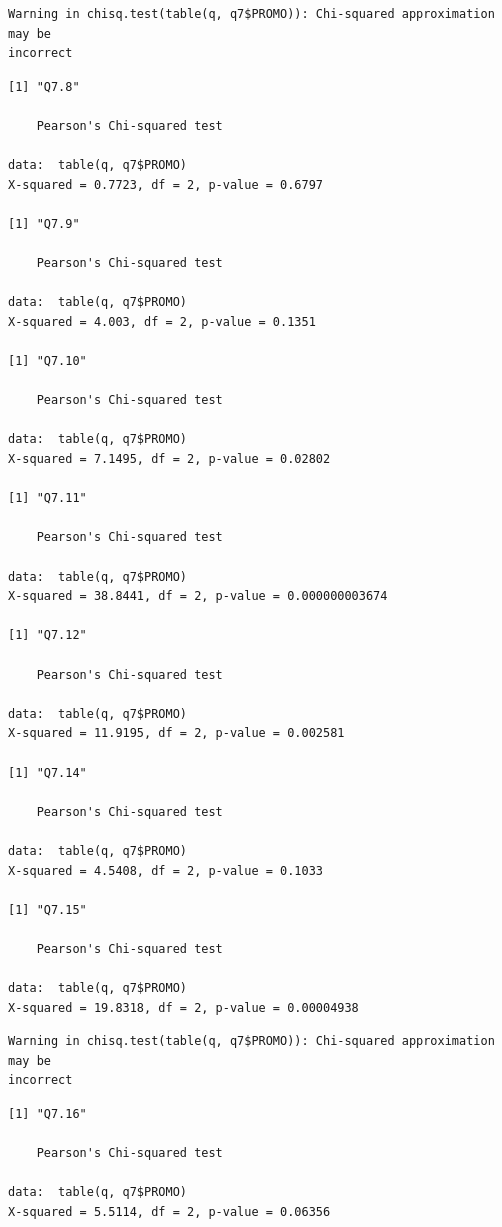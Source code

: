\documentclass[]{article}
\begin{document}
\begin{verbatim}
Warning in chisq.test(table(q, q7$PROMO)): Chi-squared approximation may be
incorrect
\end{verbatim}

\begin{verbatim}
[1] "Q7.8"

    Pearson's Chi-squared test

data:  table(q, q7$PROMO)
X-squared = 0.7723, df = 2, p-value = 0.6797

[1] "Q7.9"

    Pearson's Chi-squared test

data:  table(q, q7$PROMO)
X-squared = 4.003, df = 2, p-value = 0.1351

[1] "Q7.10"

    Pearson's Chi-squared test

data:  table(q, q7$PROMO)
X-squared = 7.1495, df = 2, p-value = 0.02802

[1] "Q7.11"

    Pearson's Chi-squared test

data:  table(q, q7$PROMO)
X-squared = 38.8441, df = 2, p-value = 0.000000003674

[1] "Q7.12"

    Pearson's Chi-squared test

data:  table(q, q7$PROMO)
X-squared = 11.9195, df = 2, p-value = 0.002581

[1] "Q7.14"

    Pearson's Chi-squared test

data:  table(q, q7$PROMO)
X-squared = 4.5408, df = 2, p-value = 0.1033

[1] "Q7.15"

    Pearson's Chi-squared test

data:  table(q, q7$PROMO)
X-squared = 19.8318, df = 2, p-value = 0.00004938
\end{verbatim}

\begin{verbatim}
Warning in chisq.test(table(q, q7$PROMO)): Chi-squared approximation may be
incorrect
\end{verbatim}

\begin{verbatim}
[1] "Q7.16"

    Pearson's Chi-squared test

data:  table(q, q7$PROMO)
X-squared = 5.5114, df = 2, p-value = 0.06356
\end{verbatim}
\end{document}
